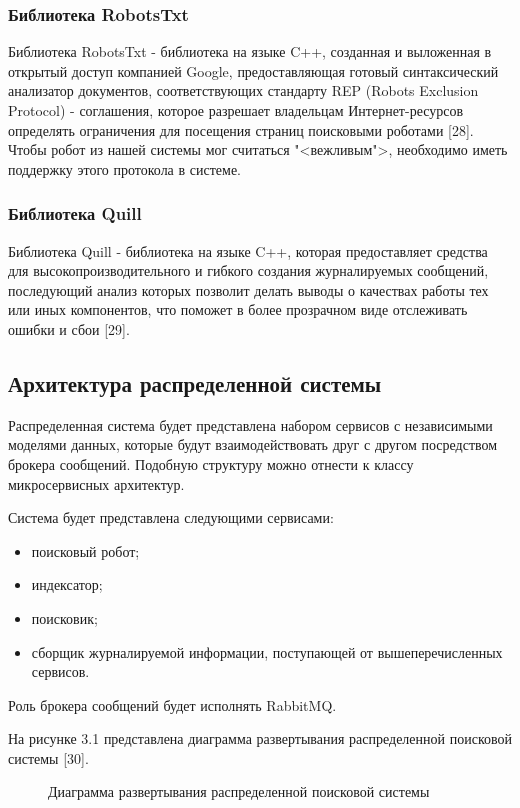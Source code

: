 \subsubsection{Библиотека RobotsTxt}

Библиотека RobotsTxt - библиотека на языке C++, созданная и выложенная в открытый доступ компанией Google, предоставляющая готовый синтаксический анализатор документов, соответствующих стандарту REP (Robots Exclusion Protocol) - соглашения, которое разрешает владельцам Интернет-ресурсов определять ограничения для посещения страниц поисковыми роботами [28]. Чтобы робот из нашей системы мог считаться "<вежливым">, необходимо иметь поддержку этого протокола в системе.

\subsubsection{Библиотека Quill}
Библиотека Quill - библиотека на языке C++, которая предоставляет средства для высокопроизводительного и гибкого создания журналируемых сообщений, последующий анализ которых позволит делать выводы о качествах работы тех или иных компонентов, что поможет в более прозрачном виде отслеживать ошибки и сбои [29].

\subsection{Архитектура распределенной системы}

Распределенная система будет представлена набором сервисов с независимыми моделями данных, которые будут взаимодействовать друг с другом посредством брокера сообщений. Подобную структуру можно отнести к классу микросервисных архитектур.

Система будет представлена следующими сервисами:
\begin{itemize}
\item поисковый робот;
\item индексатор;
\item поисковик;
\item сборщик журналируемой информации, поступающей от вышеперечисленных сервисов.
\end{itemize}

Роль брокера сообщений будет исполнять RabbitMQ.

На рисунке 3.1 представлена диаграмма развертывания распределенной поисковой системы [30].

\begin{figure}[H]
\caption{Диаграмма развертывания распределенной поисковой системы}
\label{diagram_deployment:image}
\end{figure}

